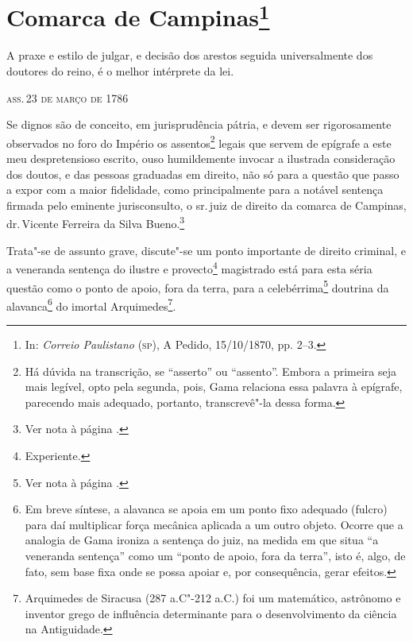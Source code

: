\chapter{Comarca de Campinas\footnote[*]{In: \emph{Correio
  Paulistano} (\textsc{sp}), A Pedido, 15/10/1870, pp. 2--3.}}


\setcounter{footnote}{-1}
\epigraph{A praxe e estilo de julgar, e decisão dos arestos\footnotemark{} seguida universalmente dos doutores do reino, é o melhor
intérprete da lei.}{\textsc{ass.\,23 de março de 1786\footnotemark}}

\setcounter{footnote}{1}
  \setcounter{footnote}{2}

\noindent{}Se dignos são de conceito, em jurisprudência pátria, e devem ser
rigorosamente observados no foro do Império os assentos\footnote{Há
  dúvida na transcrição, se ``asserto'' ou ``assento''. Embora a primeira
  seja mais legível, opto pela segunda, pois, Gama relaciona essa
  palavra à epígrafe, parecendo mais adequado, portanto, transcrevê"-la
  dessa forma.} legais que servem de epígrafe a este meu
despretensioso escrito, ouso humildemente invocar a ilustrada
consideração dos doutos, e das pessoas graduadas em direito, não só para
a questão que passo a expor com a maior fidelidade, como principalmente
para a notável sentença firmada pelo eminente jurisconsulto, o sr.\,juiz
de direito da comarca de Campinas, dr.\,Vicente Ferreira da Silva
Bueno.\footnote{Ver nota à página \pageref{bueno}.}

Trata"-se de assunto grave, discute"-se um ponto importante de direito
criminal, e a veneranda sentença do ilustre e provecto\footnote{
  Experiente.} magistrado está para esta séria questão como o ponto de
apoio, fora da terra, para a celebérrima\footnote{Ver nota à página \pageref{celebre}.} doutrina da alavanca\footnote{
  Em breve síntese, a alavanca se apoia em um ponto fixo adequado
  (fulcro) para daí multiplicar força mecânica aplicada a um outro
  objeto. Ocorre que a analogia de Gama ironiza a sentença do juiz, na
  medida em que situa ``a veneranda sentença'' como um ``ponto de apoio,
  fora da terra'', isto é, algo, de fato, sem base fixa onde se possa
  apoiar e, por consequência, gerar efeitos.} do imortal
Arquimedes\footnote{Arquimedes de Siracusa (287 a.C"-212 a.C.) foi um
  matemático, astrônomo e inventor grego de influência determinante para
  o desenvolvimento da ciência na Antiguidade.}.

